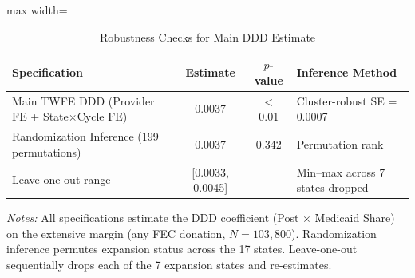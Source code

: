 \begin{table}[htbp]
\centering
\caption{Robustness Checks for Main DDD Estimate}
\label{tab:robust}
\begin{adjustbox}{max width=\textwidth}
\begin{tabular}{lccl}
\toprule
Specification & Estimate & $p$-value & Inference Method \\
\midrule
Main TWFE DDD (Provider FE + State$\times$Cycle FE)  &  0.0037  &  $<$0.01  &  Cluster-robust SE = 0.0007 \\
Randomization Inference (199 permutations)  &  0.0037  &  0.342  &  Permutation rank \\
Leave-one-out range  &  [0.0033, 0.0045]  &  &  Min--max across 7 states dropped \\
\bottomrule
\end{tabular}
\end{adjustbox}
\par\smallskip\small\textit{Notes:} All specifications estimate the DDD coefficient (Post $\times$ Medicaid Share) on the extensive margin (any FEC donation, $N = 103{,}800$). Randomization inference permutes expansion status across the 17 states. Leave-one-out sequentially drops each of the 7 expansion states and re-estimates.
\end{table}
